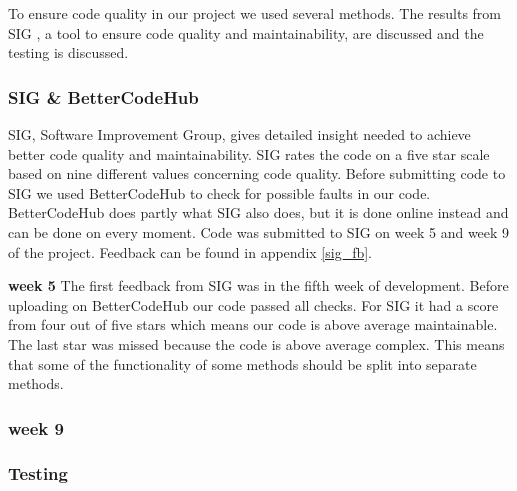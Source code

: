 To ensure code quality in our project we used several methods. The results from SIG \cite{sig}, a tool to ensure code quality and maintainability, are discussed and the testing is discussed.


\subsubsection{SIG \& BetterCodeHub}
SIG, Software Improvement Group, gives detailed insight needed to achieve better code quality and maintainability. SIG rates the code on a five star scale based on nine different values concerning code quality. Before submitting code to SIG we used BetterCodeHub\cite{better_code_hub} to check for possible faults in our code. BetterCodeHub does partly what SIG also does, but it is done online instead and can be done on every moment. Code was submitted to SIG on week 5 and week 9 of the project. Feedback can be found in appendix \ref{sig_fb}.

\textbf{week 5}
The first feedback from SIG was in the fifth week of development. Before uploading on BetterCodeHub our code passed all checks. For SIG it had a score from four out of five stars which means our code is above average maintainable. The last star was missed because the code is above average complex. This means that some of the functionality of some methods should be split into separate methods.

\subsubsection{week 9}

\subsubsection{Testing}
